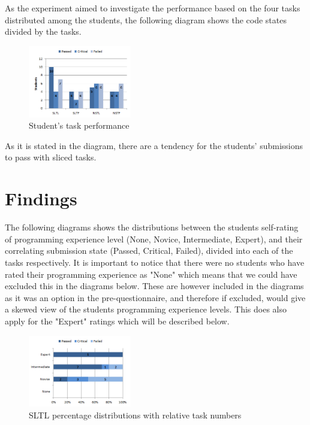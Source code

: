 \documentclass{sig-alternate-05-2015}
\begin{document}
As the experiment aimed to investigate the performance based on the four tasks distributed among the students, the following diagram shows the code states divided by the tasks.

\begin{figure}[H]
	\centering
	\includegraphics[width=0.4\textwidth]{img05}
	\caption{Student's task performance}
\end{figure}

As it is stated in the diagram, there are a tendency for the students' submissions to pass with sliced tasks.

\section{Findings}

The following diagrams shows the distributions between the students self-rating of programming experience level (None, Novice, Intermediate, Expert), and their correlating submission state (Passed, Critical, Failed), divided into each of the tasks respectively.
It is important to notice that there were no students who have rated their programming experience  as "None" which means that we could have excluded this in the diagrams below. These are however included in the diagrams as it was an option in the pre-questionnaire, and therefore if excluded, would give a skewed view of the students programming experience levels. This does also apply for the "Expert" ratings which will be described below.

\begin{figure}[H]
	\centering
	\includegraphics[width=0.4\textwidth]{img06}
	\caption{SLTL percentage distributions with relative task numbers}
\end{figure}
\end{document}
